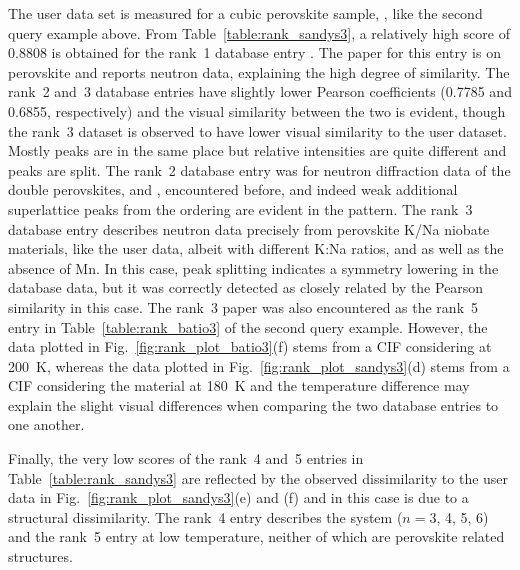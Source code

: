 \documentclass[preprint]{iucr}
\newcommand{\fig}[1]{Fig.~\ref{fig:#1}}
\newcommand{\tabl}[1]{Table~\ref{table:#1}}
\begin{document}
The user data set is measured for a cubic perovskite sample,  \cite{h.e.mgbemereElectricFieldInducedPhaseTransition2017}, like the second query example above. From \tabl{rank_sandys3}, a relatively high score of 0.8808 is obtained for the rank~1 database entry \cite{orayechModecrystallographyAnalysisCrystal2015}. 
The paper for this entry is on  perovskite and reports neutron data, explaining the high degree of similarity.
The rank~2 \cite{iturbe-zabaloSymmetrymodeAnalysisPhase2013} and~3 \cite{zhangStructuresK005Na02009} database entries  have slightly lower Pearson coefficients (0.7785 and 0.6855, respectively) and the visual similarity between the two is evident, though the rank~3 dataset is observed to have lower visual similarity to the user dataset. Mostly peaks are in the same place but relative intensities are quite different and peaks are split. The rank~2 database entry was for neutron diffraction data of the double perovskites,  and , encountered before, and indeed weak additional superlattice peaks from the ordering are evident in the pattern.  The rank~3 database entry  describes neutron data precisely from perovskite K/Na niobate materials, like the user data, albeit with different K:Na ratios,  and  as well as the absence of Mn. In this case, peak splitting indicates a symmetry lowering in the database data, but it was correctly detected as closely related by the Pearson similarity in this case.
The rank~3 paper \cite{zhangStructuresK005Na02009} was also encountered as the rank~5 entry in \tabl{rank_batio3} of the second query example. However, the data plotted in \fig{rank_plot_batio3}(f) stems from a CIF considering  at 200~K, whereas the data plotted in \fig{rank_plot_sandys3}(d) stems from a CIF considering the material at 180~K and the temperature difference may explain the slight visual differences when comparing the two database entries to one another.

Finally, the very low scores of the rank~4 and~5 entries in \tabl{rank_sandys3} are reflected by the observed dissimilarity to the user data in \fig{rank_plot_sandys3}(e) and (f) and in this case is due to a structural dissimilarity. The rank~4 entry \cite{bereciartuaStructureRefinementSuperspace2012c} describes the system
 ($n=3$, 4, 5, 6) and the rank~5 entry \cite{palaciosPhasesCH34N2003}  at low temperature, neither of which are perovskite related structures.
\end{document}
